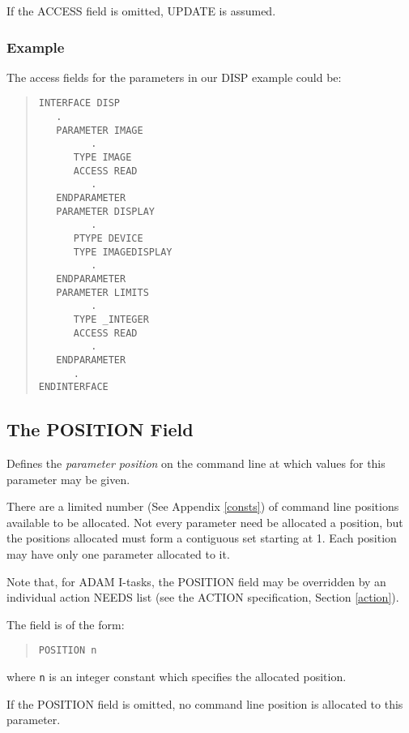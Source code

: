 \documentclass[twoside,11pt]{article}
\newcommand{\xlabel}[1]{}
\renewcommand{\_}{\texttt{\symbol{95}}}
\begin{document}
If the ACCESS field is omitted, UPDATE is assumed.

\subsubsection*{Example}
The access fields for the parameters in our DISP example could be:
\begin{quote} \begin{verbatim}
INTERFACE DISP
   .
   PARAMETER IMAGE
         .
      TYPE IMAGE
      ACCESS READ
         .
   ENDPARAMETER
   PARAMETER DISPLAY
         .
      PTYPE DEVICE
      TYPE IMAGEDISPLAY
         .
   ENDPARAMETER
   PARAMETER LIMITS
         .
      TYPE _INTEGER
      ACCESS READ
         .
   ENDPARAMETER
      .
ENDINTERFACE
\end{verbatim} \end{quote}

\subsection{The POSITION Field\xlabel{the_position_field}}

Defines the {\em parameter position} on the command line at which values for 
this parameter may be given.

There are a limited number (See Appendix \ref{consts}) of
command line positions available to be allocated. Not every parameter need
be allocated a position, but the positions allocated must form a contiguous
set starting at 1.
Each position may have only one parameter allocated to it.

Note that, for ADAM I-tasks, the POSITION field may be overridden by an 
individual action NEEDS list (see the ACTION specification, Section 
\ref{action}).

The field is of the form:
\begin{quote} \begin{verbatim}
POSITION n
\end{verbatim} \end{quote}
where \texttt{n} is an integer constant which specifies the allocated position.

If the POSITION field is omitted, no command line position is allocated to this
parameter.
\end{document}

